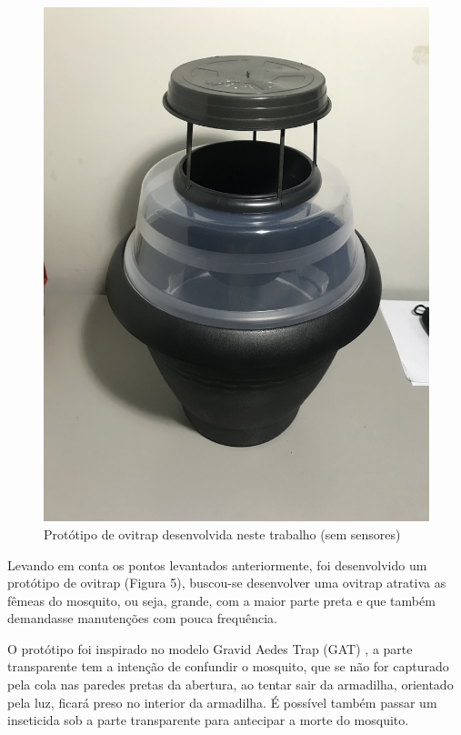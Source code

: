 \documentclass[
	12pt,				%
	openright,			%
	oneside,			%
	a4paper,			%
	chapter=TITLE,		%
	english,			%
	brazil				%
	]{abntex2}
\begin{document}
\begin{figure}[h]
\centering
\includegraphics[scale=0.1, angle=-90]{imagens/prototipo1_2.jpg}
\caption{Protótipo de ovitrap desenvolvida neste trabalho (sem sensores)}
\end{figure}

Levando em conta os pontos levantados anteriormente, foi desenvolvido um protótipo de ovitrap (Figura 5), buscou-se desenvolver 
uma ovitrap atrativa 
as fêmeas do mosquito, ou seja, grande, com a maior parte preta e que também demandasse manutenções com pouca frequência.

O protótipo foi inspirado no modelo Gravid Aedes Trap (GAT) \cite{ALVARO2014}, a parte transparente tem a intenção de confundir 
o mosquito, que se não for capturado
pela cola nas paredes pretas da abertura, ao tentar sair da armadilha, orientado pela luz, ficará preso no interior da armadilha. 
É possível também passar um inseticida sob a parte transparente para antecipar
a morte do mosquito.
\end{document}
